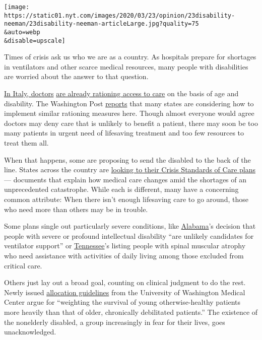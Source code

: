\texttt{[image: https://static01.nyt.com/images/2020/03/23/opinion/23disability-neeman/23disability-neeman-articleLarge.jpg?quality=75\\\&auto=webp\\\&disable=upscale]}

Times of crisis ask us who we are as a country. As hospitals prepare for
shortages in ventilators and other scarce medical resources, many people
with disabilities are worried about the answer to that question.

\href{http://www.siaarti.it/SiteAssets/News/COVID19\%20-\%20documenti\%20SIAARTI/SIAARTI\%20-\%20Covid19\%20-\%20Raccomandazioni\%20di\%20etica\%20clinica.pdf}{In
Italy, doctors}
\href{https://www.theatlantic.com/ideas/archive/2020/03/who-gets-hospital-bed/607807/}{are
already rationing access to care} on the basis of age and disability.
The Washington Post
\href{https://www.washingtonpost.com/health/2020/03/15/coronavirus-rationing-us/}{reports}
that many states are considering how to implement similar rationing
measures here. Though almost everyone would agree doctors may deny care
that is unlikely to benefit a patient, there may soon be too many
patients in urgent need of lifesaving treatment and too few resources to
treat them all.

When that happens, some are proposing to send the disabled to the back
of the line. States across the country are
\href{https://www.washingtonpost.com/health/2020/03/15/coronavirus-rationing-us/?fbclid=IwAR057A8cmTE1u90ZhjhyWMIkK7gnDmOE1l6FrKBOZE8BUSEgYTtFr7Nl9_w}{looking
to their Crisis Standards of Care plans} --- documents that explain how
medical care changes amid the shortages of an unprecedented catastrophe.
While each is different, many have a concerning common attribute: When
there isn't enough lifesaving care to go around, those who need more
than others may be in trouble.

Some plans single out particularly severe conditions, like
\href{http://www.adph.org/CEP/assets/VENTTRIAGE.pdf}{Alabama}'s decision
that people with severe or profound intellectual disability ``are
unlikely candidates for ventilator support'' or
\href{https://www.tn.gov/content/dam/tn/health/documents/2016_Guidance_for_the_Ethical_Allocation_of_Scarce_Resources.pdf}{Tennessee}'s
listing people with spinal muscular atrophy who need assistance with
activities of daily living among those excluded from critical care.

Others just lay out a broad goal, counting on clinical judgment to do
the rest. Newly issued
\href{https://covid-19.uwmedicine.org/Screening\%20and\%20Testing\%20Algorithms/Other\%20Inpatient\%20Clinical\%20Guidance/Clinical\%20Care\%20in\%20ICU/Material\%20Resource\%20Allocation.COVID19.docx}{allocation
guidelines} from the University of Washington Medical Center argue for
``weighting the survival of young otherwise-healthy patients more
heavily than that of older, chronically debilitated patients.'' The
existence of the nonelderly disabled, a group increasingly in fear for
their lives, goes unacknowledged.


